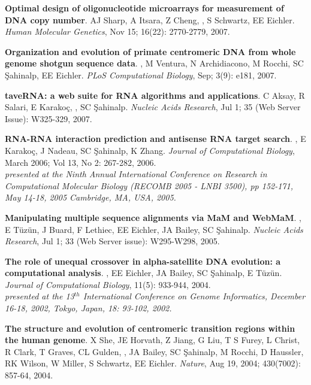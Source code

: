 \vspace{-.2cm}
 {\bf Optimal design of oligonucleotide microarrays for measurement of DNA copy number}.
 AJ Sharp, A Itsara, Z Cheng, \calkan{}, S Schwartz, EE Eichler.
 {\em Human Molecular Genetics}, Nov 15; 16(22): 2770-2779, 2007.


\vspace{-.2cm}
 {\bf Organization and evolution of primate centromeric DNA from whole genome shotgun sequence data}.
 \calkan{}, M Ventura, N Archidiacono, M Rocchi, SC \c{S}ahinalp, EE Eichler.
 {\em PLoS Computational Biology}, Sep; 3(9): e181, 2007.


\vspace{-.2cm}
 {\bf taveRNA: a web suite for RNA algorithms and applications}.
  C Aksay, R Salari, E Karako\c{c}, \calkan{}, SC \c{S}ahinalp.
  {\em Nucleic Acids Research}, Jul 1; 35 (Web Server Issue): W325-329, 2007.

\vspace{-.2cm}
 {\bf RNA-RNA interaction prediction and antisense RNA target search}.
  \calkan{}, E Karako\c{c}, J Nadeau, SC \c{S}ahinalp,
  K Zhang.
  {\em Journal of Computational Biology}, March 2006; Vol 13, No 2: 267-282, 2006. \\
\hspace*{1cm} {\footnotesize {\it presented at the Ninth Annual International Conference on Research in Computational Molecular Biology
    (RECOMB 2005 - LNBI 3500), pp 152-171, 
    May 14-18, 2005 Cambridge, MA, USA, 2005.}}


\vspace{-.2cm}
{\bf Manipulating multiple sequence alignments via MaM and  WebMaM}.
\calkan{}, E T\"{u}z\"{u}n, J Buard, F Lethiec,
EE Eichler, JA Bailey, SC \c{S}ahinalp.
{\em Nucleic Acids Research}, Jul 1; 33 (Web Server issue):
W295-W298, 2005.

\vspace{-.2cm}
 {\bf The role of unequal crossover in alpha-satellite 
   DNA evolution: a computational analysis}.
  \calkan{}, EE Eichler, JA Bailey, SC \c{S}ahinalp, E T\"{u}z\"{u}n.
  {\em Journal of Computational Biology}, 11(5): 933-944, 2004. \\
\hspace*{1cm}  {\footnotesize {\it presented at the 13$^{th}$ International Conference on Genome Informatics, 
December 16-18, 2002, Tokyo, Japan, 18: 93-102, 2002.}}

\vspace{-.2cm}
  {\bf The structure and evolution of centromeric transition regions within
    the human genome}.
  X She, JE Horvath, Z Jiang, G Liu, T S Furey,
  L Christ, R Clark, T Graves, CL Gulden, \calkan{}, JA Bailey, SC \c{S}ahinalp, 
  M Rocchi, D Haussler, RK Wilson, W Miller, S Schwartz, EE Eichler.
  {\em Nature}, Aug 19, 2004; 430(7002): 857-64, 2004.



